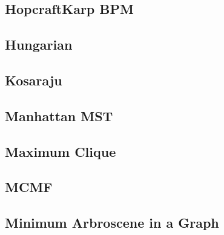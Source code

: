 \subsection{HopcraftKarp BPM}
\vspace{-2ex}
\raggedbottom
\vspace{-3.2ex}
\hrulefill
\subsection{Hungarian}
\vspace{-2ex}
\raggedbottom
\vspace{-3.2ex}
\hrulefill
\subsection{Kosaraju}
\vspace{-2ex}
\raggedbottom
\vspace{-3.2ex}
\hrulefill
\subsection{Manhattan MST}
\vspace{-2ex}
\raggedbottom
\vspace{-3.2ex}
\hrulefill
\subsection{Maximum Clique}
\vspace{-2ex}
\raggedbottom
\vspace{-3.2ex}
\hrulefill
\subsection{MCMF}
\vspace{-2ex}
\raggedbottom
\vspace{-3.2ex}
\hrulefill
\subsection{Minimum Arbroscene in a Graph}
\vspace{-2ex}
\raggedbottom
\vspace{-3.2ex}
\hrulefill
